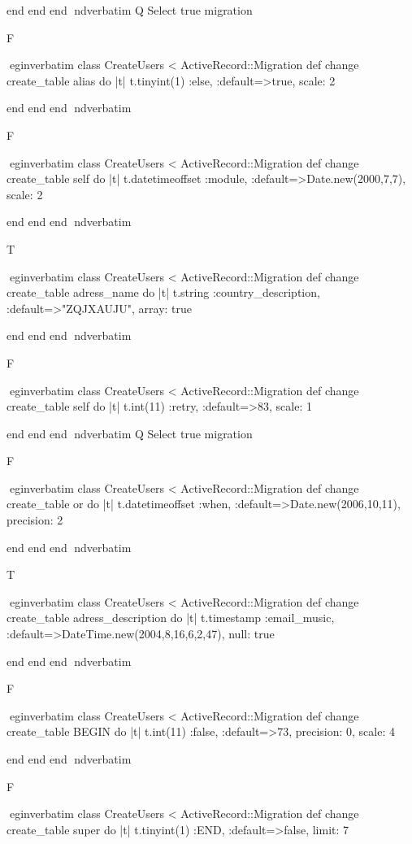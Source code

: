     end 
  end 
end
nd{verbatim}
Q
 Select true migration

F

egin{verbatim}
 class CreateUsers < ActiveRecord::Migration 
  def change 
    create_table alias do |t| 
      t.tinyint(1) :else, :default=>true, scale: 2
    
    end 
  end 
end
nd{verbatim}

F

egin{verbatim}
 class CreateUsers < ActiveRecord::Migration 
  def change 
    create_table self do |t| 
      t.datetimeoffset :module, :default=>Date.new(2000,7,7), scale: 2
    
    end 
  end 
end
nd{verbatim}

T

egin{verbatim}
 class CreateUsers < ActiveRecord::Migration 
  def change 
    create_table adress_name do |t| 
      t.string :country_description, :default=>"ZQJXAUJU", array: true
    
    end 
  end 
end
nd{verbatim}

F

egin{verbatim}
 class CreateUsers < ActiveRecord::Migration 
  def change 
    create_table self do |t| 
      t.int(11) :retry, :default=>83, scale: 1
    
    end 
  end 
end
nd{verbatim}
Q
 Select true migration

F

egin{verbatim}
 class CreateUsers < ActiveRecord::Migration 
  def change 
    create_table or do |t| 
      t.datetimeoffset :when, :default=>Date.new(2006,10,11), precision: 2
    
    end 
  end 
end
nd{verbatim}

T

egin{verbatim}
 class CreateUsers < ActiveRecord::Migration 
  def change 
    create_table adress_description do |t| 
      t.timestamp :email_music, :default=>DateTime.new(2004,8,16,6,2,47), null: true
    
    end 
  end 
end
nd{verbatim}

F

egin{verbatim}
 class CreateUsers < ActiveRecord::Migration 
  def change 
    create_table BEGIN do |t| 
      t.int(11) :false, :default=>73, precision: 0, scale: 4
    
    end 
  end 
end
nd{verbatim}

F

egin{verbatim}
 class CreateUsers < ActiveRecord::Migration 
  def change 
    create_table super do |t| 
      t.tinyint(1) :END, :default=>false, limit: 7
    
